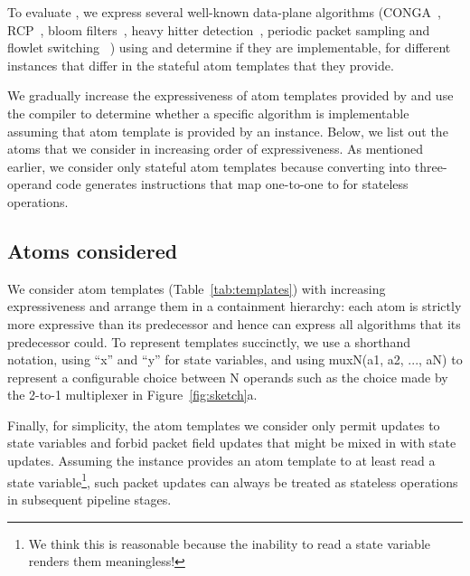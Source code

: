 To evaluate \pktlanguage, we express several well-known data-plane algorithms
(CONGA~\cite{conga}, RCP~\cite{rcp}, bloom filters~\cite{bloom}, heavy hitter
detection~\cite{opensketch}, periodic packet sampling and flowlet switching
~\cite{flowlets}) using \pktlanguage and determine if they are implementable,
for different \absmachine instances that differ in the stateful atom templates
that they provide.

We gradually increase the expressiveness of atom templates provided by
\pktlanguage and use the \pktlanguage compiler to determine whether a specific
algorithm is implementable assuming that atom template is provided by an
\absmachine instance. Below, we list out the atoms that we consider in
increasing order of expressiveness. As mentioned earlier, we consider only
stateful atom templates because converting into three-operand code generates
instructions that map one-to-one to \absmachine for stateless operations.

\subsection{Atoms considered}

We consider atom templates (Table~\ref{tab:templates}) with increasing
expressiveness and arrange them in a containment hierarchy: each atom is
strictly more expressive than its predecessor and hence can express all
algorithms that its predecessor could. To represent templates succinctly, we
use a shorthand notation, using ``x'' and ``y'' for state variables, and using
muxN(a1, a2, ..., aN) to represent a configurable choice between N operands
such as the choice made by the 2-to-1 multiplexer in Figure~\ref{fig:sketch}a.

Finally, for simplicity, the atom templates we consider only permit updates to
state variables and forbid packet field updates that might be mixed in with
state updates. Assuming the \absmachine instance provides an atom template to
at least read a state variable\footnote{We think this is reasonable because the
inability to read a state variable renders them meaningless!}, such packet
updates can always be treated as stateless operations in subsequent pipeline
stages.

